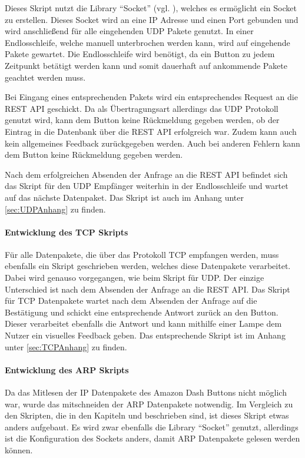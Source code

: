 Dieses Skript nutzt die Library ``Socket'' (vgl. \cite{.20.02.2017}), welches es ermöglicht ein Socket zu erstellen. Dieses Socket wird an eine \ac{IP} Adresse und einen Port gebunden und wird anschließend für alle eingehenden \ac{UDP} Pakete genutzt. In einer Endlosschleife, welche manuell unterbrochen werden kann, wird auf eingehende Pakete gewartet. Die Endlosschleife wird benötigt, da ein Button zu jedem Zeitpunkt betätigt werden kann und somit dauerhaft auf ankommende Pakete geachtet werden muss. 

Bei Eingang eines entsprechenden Pakets wird ein entsprechendes Request an die \ac{REST} \ac{API} geschickt. Da als Übertragungsart allerdings das UDP Protokoll genutzt wird, kann dem Button keine Rückmeldung gegeben werden, ob der Eintrag in die Datenbank über die \ac{REST} \ac{API} erfolgreich war. Zudem kann auch kein allgemeines Feedback zurückgegeben werden. Auch bei anderen Fehlern kann dem Button keine Rückmeldung gegeben werden. 

Nach dem erfolgreichen Absenden der Anfrage an die \ac{REST} \ac{API} befindet sich das Skript für den \ac{UDP} Empfänger weiterhin in der Endlosschleife und wartet auf das nächste Datenpaket. 
Das Skript ist auch im Anhang unter \ref{sec:UDPAnhang} zu finden. 

\paragraph{Entwicklung des TCP Skripts}$\;$ \\  
\label{sec:Entwicklung des TCP Skripts-1} 
Für alle Datenpakete, die über das Protokoll \ac{TCP} empfangen werden, muss ebenfalls ein Skript geschrieben werden, welches diese Datenpakete verarbeitet. Dabei wird genauso vorgegangen, wie beim Skript für UDP. Der einzige Unterschied ist nach dem Absenden der Anfrage an die \ac{REST} \ac{API}. Das Skript für \ac{TCP} Datenpakete wartet nach dem Absenden der Anfrage auf die Bestätigung und schickt eine entsprechende Antwort zurück an den Button. Dieser verarbeitet ebenfalls die Antwort und kann mithilfe einer Lampe dem Nutzer ein visuelles Feedback geben. 
Das entsprechende Skript ist im Anhang unter \ref{sec:TCPAnhang} zu finden.

\paragraph{Entwicklung des ARP Skripts}$\;$ \\  
\label{sec:Entwicklung des ARP Skripts-1} 
Da das Mitlesen der \ac{IP} Datenpakete des Amazon Dash Buttons nicht möglich war, wurde das mitschneiden der \ac{ARP} Datenpakete notwendig. 
Im Vergleich zu den Skripten, die in den Kapiteln  und  beschrieben sind, ist dieses Skript etwas anders aufgebaut. Es wird zwar ebenfalls die Library ``Socket'' genutzt, allerdings ist die Konfiguration des Sockets anders, damit \ac{ARP} Datenpakete gelesen werden können. 


